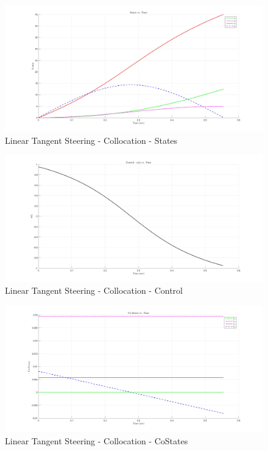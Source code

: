 \documentclass[11pt,usenames]{article}
\begin{document}
	\begin{figure}[htpb]
		\centering
		\includegraphics[scale=0.13]{Collocation_LTS_States.jpg}
		\caption{Linear Tangent Steering - Collocation - States}
	\end{figure}
	
	\begin{figure}[htpb]
		\centering
		\includegraphics[scale=0.13]{Collocation_LTS_Control.jpg}
		\caption{Linear Tangent Steering - Collocation - Control}
	\end{figure}
	
	\begin{figure}[htpb]
		\centering
		\includegraphics[scale=0.13]{Collocation_LTS_CoStates.jpg}
		\caption{Linear Tangent Steering - Collocation - CoStates}
	\end{figure}
	
\end{document}
